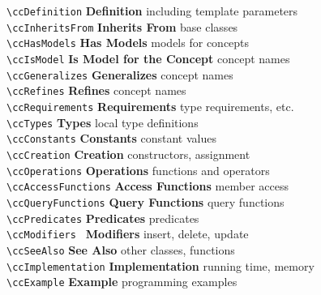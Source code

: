 \documentclass[11pt]{article}
\begin{document}
\begin{tabbing}
  \> \verb+\ccDefinition+      \>  {\bf Definition}    \> 
                                          including template parameters\\
  \> \verb+\ccInheritsFrom+    \>  {\bf Inherits From}     \> 
                                                     base classes\\
  \> \verb+\ccHasModels+       \>  {\bf Has Models}     \> 
                                                     models for concepts\\
  \> \verb+\ccIsModel+         \>  {\bf Is Model for the Concept}     \> 
                                                     concept names\\
  \> \verb+\ccGeneralizes+     \>  {\bf Generalizes}     \> 
                                                     concept names\\
  \> \verb+\ccRefines+         \>  {\bf Refines}     \> 
                                                     concept names\\
  \> \verb+\ccRequirements+    \>  {\bf Requirements}     \> 
                                                     type requirements, etc.\\
  \> \verb+\ccTypes+           \>  {\bf Types}         \>
                                                     local type definitions \\
  \> \verb+\ccConstants+       \>  {\bf Constants}     \> 
                                                     constant values\\
  \> \verb+\ccCreation+        \>  {\bf Creation}      \> 
                                                     constructors, assignment\\
  \> \verb+\ccOperations+      \>  {\bf Operations}    \> 
                                                     functions and operators\\
  \> \verb+\ccAccessFunctions+ \>  {\bf Access Functions}    \> 
                                                     member access\\
  \> \verb+\ccQueryFunctions+ \>   {\bf Query Functions}    \> 
                                                     query functions\\
  \> \verb+\ccPredicates+      \>  {\bf Predicates}    \> 
                                                     predicates\\
  \> \verb+\ccModifiers +      \>  {\bf Modifiers}    \> 
                                                     insert, delete, update\\
  \> \verb+\ccSeeAlso+         \>  {\bf See Also}\> 
                                                     other classes, functions\\
  \> \verb+\ccImplementation+  \>  {\bf Implementation}\> 
                                                     running time, memory\\
  \> \verb+\ccExample+         \>  {\bf Example}       \>
                                                     programming examples
\end{tabbing}
\end{document}
